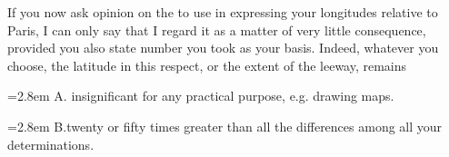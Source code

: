 \par\noindent\hspace*{\parindent}If you now ask  opinion on the  to use in expressing your longitudes relative to Paris, I can only say that I regard it as a matter of very little consequence, provided you also state  number you took as your basis. Indeed, whatever you choose, the latitude in this respect, or the extent of the leeway, remains
\par\noindent\hspace*{\parindent}\hangindent=2.8em A.\quad {} insignificant for any practical purpose, e.g. drawing maps.
\par\noindent\hspace*{\parindent}\hangindent=2.8em B.\quad twenty or fifty times greater than all the  differences among all your determinations.


